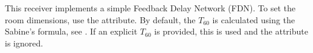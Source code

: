 This receiver implements a simple Feedback Delay Network (FDN). To set
the room dimensions, use the  attribute. By default,
the $T_{60}$ is calculated using the Sabine's formula, see
. If an explicit $T_{60}$ is provided, this is used
and the  attribute is ignored.


